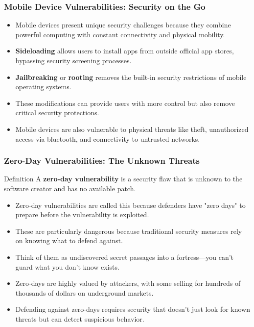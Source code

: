 \documentclass{beamer}
\begin{document}
\begin{frame}
    \frametitle{Mobile Device Vulnerabilities: Security on the Go}
    
    \begin{itemize}
        \item Mobile devices present unique security challenges because they combine powerful computing with constant connectivity and physical mobility.
        \item \textbf{Sideloading} allows users to install apps from outside official app stores, bypassing security screening processes.
        \item \textbf{Jailbreaking} or \textbf{rooting} removes the built-in security restrictions of mobile operating systems.
        \item These modifications can provide users with more control but also remove critical security protections.
        \item Mobile devices are also vulnerable to physical threats like theft, unauthorized access via bluetooth, and connectivity to untrusted networks.
    \end{itemize}
\end{frame}

\begin{frame}
    \frametitle{Zero-Day Vulnerabilities: The Unknown Threats}
    
    \begin{block}{Definition}
        A \textbf{zero-day vulnerability} is a security flaw that is unknown to the software creator and has no available patch.
    \end{block}
    
    \begin{itemize}
        \item Zero-day vulnerabilities are called this because defenders have "zero days" to prepare before the vulnerability is exploited.
        \item These are particularly dangerous because traditional security measures rely on knowing what to defend against.
        \item Think of them as undiscovered secret passages into a fortress—you can't guard what you don't know exists.
        \item Zero-days are highly valued by attackers, with some selling for hundreds of thousands of dollars on underground markets.
        \item Defending against zero-days requires security that doesn't just look for known threats but can detect suspicious behavior.
    \end{itemize}
\end{frame}
\end{document}
